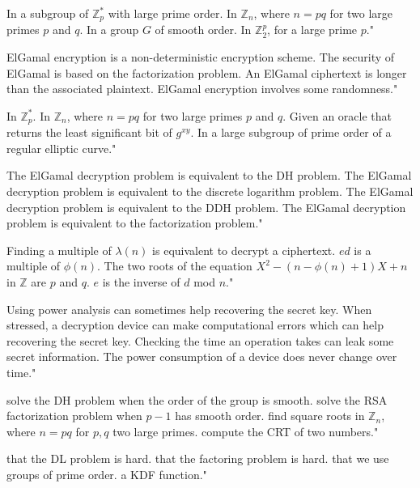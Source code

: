{In a subgroup of $\mathbb{Z}_p^*$ with large prime order.}
{In $\mathbb{Z}_n$, where $n= pq$ for two large primes $p$ and $q$.}
{In a group $G$ of smooth order.}
{In $\mathbb{Z}_2^p$, for a large prime $p$."}

{ElGamal encryption is a non-deterministic encryption scheme.}
{The security of ElGamal is based on the factorization problem.}
{An ElGamal ciphertext is longer than the associated plaintext.}
{ElGamal encryption involves some randomness."}

{In $\mathbb{Z}_p^*$.}
{In $\mathbb{Z}_n$, where $n = pq$ for two large primes $p$ and $q$.}
{Given an oracle that returns the least significant bit of $g^{xy}$.}
{In a large subgroup of prime order of a regular elliptic curve."}

{The ElGamal decryption problem is equivalent to the DH problem.}
{The ElGamal decryption problem is equivalent to the discrete logarithm problem.}
{The ElGamal decryption problem is equivalent to the DDH problem.}
{The ElGamal decryption problem is equivalent to the factorization problem."}

{Finding a multiple of $\lambda(n)$ is equivalent to decrypt a ciphertext.}
{$ed$ is a multiple of $\phi(n)$.}
{The two roots of the equation $X^2 - (n-\phi(n)+1)X+n$ in $\mathbb{Z}$ are $p$ and $q$.}
{$e$ is the inverse of $d$ mod $n$."}

{Using power analysis can sometimes help recovering the secret key.}
{When stressed, a decryption device can make computational errors which can help recovering the secret key.}
{Checking the time an operation takes can leak some secret information.}
{The power consumption of a device does never change over time."}

{solve the DH problem when the order of the group is smooth.}
{solve the RSA factorization problem when $p-1$ has smooth order.}
{find square roots in $\mathbb{Z}_n$, where $n=pq$ for $p,q$ two large primes.}
{compute the CRT of two numbers."}

{that the DL problem is hard.}
{that the factoring problem is hard.}
{that we use groups of prime order.}
{a KDF function."}

